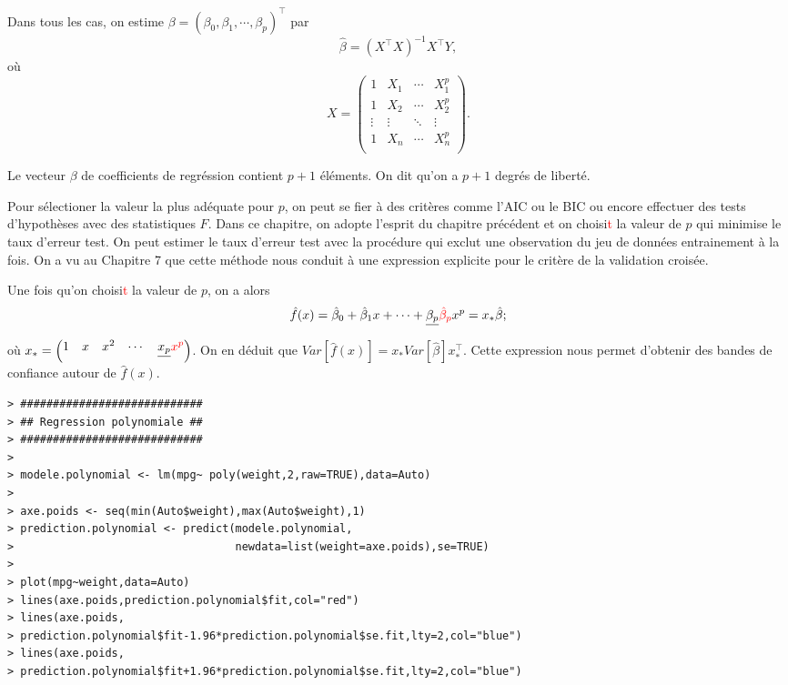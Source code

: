 \documentclass[11pt]{article}
\begin{document}
\noindent Dans tous les cas, on estime $\beta=(\beta_0,\beta_1,\cdots,\beta_p)^\top$ par 
$$\hat \beta = (X^\top X)^{-1} X^\top Y,$$
o\`u
$$X =\begin{pmatrix} 1 & X_1 & \cdots & X_1^p \\
                     1 & X_2 & \cdots & X_2^p \\
                     \vdots & \vdots & \ddots & \vdots \\
                     1 & X_n & \cdots & X_n^p \\
\end{pmatrix}.$$ 

\noindent Le vecteur $\beta$ de coefficients de regr\'ession contient $p+1$ \'el\'ements. On dit qu'on a $p+1$ degr\'es de libert\'e.

\noindent Pour s\'electioner la valeur la plus ad\'equate pour $p$, on peut se fier \`a des crit\`eres comme l'AIC ou le BIC ou encore effectuer des tests d'hypoth\`eses avec des statistiques $F$. Dans ce chapitre, on adopte l'esprit du chapitre pr\'ec\'edent et on choisi\textcolor{red}{t} la valeur de $p$ qui minimise le taux d'erreur test. On peut estimer le taux d'erreur test avec la proc\'edure qui exclut une observation du jeu de donn\'ees entrainement \`a la fois. On a vu au Chapitre 7 que cette m\'ethode nous conduit \`a une expression explicite pour le crit\`ere de la validation crois\'ee.

\noindent Une fois qu'on choisi\textcolor{red}{t} la valeur de $p$, on a alors
$$\hat f(x) = \hat\beta_0 + \hat\beta_1 x + \cdots + \sout{\beta_p}\textcolor{red}{\hat\beta_p} x^p = x_* \hat\beta;$$
\noindent o\`u $x_* = \begin{pmatrix} 1 & x & x^2 & \cdots & \sout{x_p}\textcolor{red}{x^p} \end{pmatrix}$.
\noindent On en d\'eduit que $Var[\hat f(x)]= x_* Var[\hat\beta] x_*^\top$. Cette expression nous permet d'obtenir des bandes de confiance autour de $\hat f(x)$.

\begin{verbatim}
> ############################
> ## Regression polynomiale ##
> ############################
> 
> modele.polynomial <- lm(mpg~ poly(weight,2,raw=TRUE),data=Auto)
> 
> axe.poids <- seq(min(Auto$weight),max(Auto$weight),1)
> prediction.polynomial <- predict(modele.polynomial,
>                                  newdata=list(weight=axe.poids),se=TRUE)
> 
> plot(mpg~weight,data=Auto)
> lines(axe.poids,prediction.polynomial$fit,col="red")
> lines(axe.poids,
> prediction.polynomial$fit-1.96*prediction.polynomial$se.fit,lty=2,col="blue")
> lines(axe.poids,
> prediction.polynomial$fit+1.96*prediction.polynomial$se.fit,lty=2,col="blue")
\end{verbatim}
\end{document}
